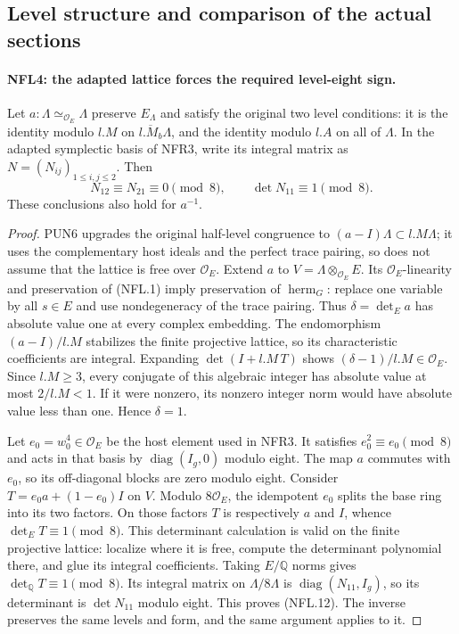 \documentclass[11pt,a4paper]{article}
\numberwithin{equation}{section}
\theoremstyle{remark}\newtheorem{remark}[theorem]{Remark}
\begin{document}
\subsection{Level structure and comparison of the actual sections}

\paragraph{NFL4: the adapted lattice forces the required level-eight sign.}
\label{claim:NFL4}
Let $a:\Lambda\simeq_{\mathcal O_E}\Lambda$ preserve $E_\Lambda$
and satisfy the original two level conditions: it is the identity
modulo $l.M$ on $\overline{l.M_b}\Lambda$, and the identity modulo
$l.A$ on all of $\Lambda$.  In the adapted symplectic basis of
NFR3, write its integral matrix as
$N=(N_{ij})_{1\le i,j\le2}$.  Then
\[
 N_{12}\equiv N_{21}\equiv0\pmod8,\qquad
 \det N_{11}\equiv1\pmod8.
 \tag{NFL.12}
\]
These conclusions also hold for $a^{-1}$.

\begin{proof}
PUN6 upgrades the original half-level congruence to
$(a-I)\Lambda\subset l.M\Lambda$; it uses the complementary
host ideals and the perfect trace pairing, so does not assume
that the lattice is free over $\mathcal O_E$.
Extend $a$ to $V=\Lambda\otimes_{\mathcal O_E}E$.
Its $\mathcal O_E$-linearity and preservation of (NFL.1) imply
preservation of $\operatorname{herm}_G$: replace one variable
by all $s\in E$ and use nondegeneracy of the trace pairing.
Thus $\delta=\det_Ea$ has absolute value one at every complex
embedding.  The endomorphism $(a-I)/l.M$ stabilizes the finite
projective lattice, so its characteristic coefficients are
integral.  Expanding $\det(I+l.M\,T)$ shows
$(\delta-1)/l.M\in\mathcal O_E$.  Since $l.M\ge3$, every
conjugate of this algebraic integer has absolute value at most
$2/l.M<1$.  If it were nonzero, its nonzero integer norm would
have absolute value less than one.  Hence $\delta=1$.

Let $e_0=w_0^4\in\mathcal O_E$ be the host element used in NFR3.
It satisfies $e_0^2\equiv e_0\pmod8$ and acts in that basis by
$\operatorname{diag}(I_g,0)$ modulo eight.
The map $a$ commutes with $e_0$, so its off-diagonal blocks are
zero modulo eight.  Consider $T=e_0a+(1-e_0)I$ on $V$.
Modulo $8\mathcal O_E$, the idempotent $e_0$ splits the base ring
into its two factors.  On those factors $T$ is respectively
$a$ and $I$, whence $\det_ET\equiv1\pmod8$.
This determinant calculation is valid on the finite projective
lattice: localize where it is free, compute the determinant
polynomial there, and glue its integral coefficients.
Taking $E/\mathbb Q$ norms gives
$\det_{\mathbb Q}T\equiv1\pmod8$.
Its integral matrix on $\Lambda/8\Lambda$ is
$\operatorname{diag}(N_{11},I_g)$, so its determinant is
$\det N_{11}$ modulo eight.  This proves (NFL.12).
The inverse preserves the same levels and form, and the same
argument applies to it.
\end{proof}
\end{document}
